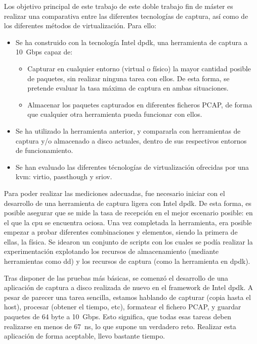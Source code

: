 \newpage
{}

Los objetivo principal de este trabajo de este doble trabajo fin de máster es realizar una comparativa entre las diferentes tecnologías de captura, así como de los diferentes métodos de virtualización. Para ello:

\begin{itemize}
\item Se ha construido con la tecnología Intel \gls{dpdk}, una herramienta de captura a 10~Gbps capaz de:
\begin{itemize}
\item Capturar en cualquier entorno (virtual o físico) la mayor cantidad posible de paquetes, sin realizar ninguna tarea con ellos. De esta forma, se pretende evaluar la tasa máxima de captura en ambas situaciones.
\item Almacenar los paquetes capturados en diferentes ficheros PCAP, de forma que cualquier otra herramienta pueda funcionar con ellos.
\end{itemize}
\item Se ha utilizado la herramienta anterior, y compararla con herramientas de captura y/o almacenado a disco actuales, dentro de sus respectivos entornos de funcionamiento.
\item Se han evaluado las diferentes técnologías de virtualización ofrecidas por una \gls{kvm}: \gls{virtio}, \gls{passthough} y \gls{sriov}.
\end{itemize}


Para poder realizar las mediciones adecuadas, fue necesario iniciar con el desarrollo de una herramienta de captura ligera con Intel \gls{dpdk}. De esta forma, es posible asegurar que se mide la tasa de recepción en el mejor escenario posible: en el que la \gls{cpu} se encuentra ociosa.
Una vez completada la herramienta, era posible empezar a probar diferentes combinaciones y elementos, siendo la primera de ellas, la física. Se idearon un conjunto de scripts con los cuales se podía realizar la experimentación explotando los recursos de almacenamiento (mediante herramientas como dd) y los recursos de captura (como la herramienta en \gls{dpdk}).

Tras disponer de las pruebas más básicas, se comenzó el desarrollo de una aplicación de captura a disco realizada de nuevo en el framework de Intel \gls{dpdk}. A pesar de parecer una tarea sencilla, estamos hablando de capturar (copia hasta el host), procesar (obtener el tiempo, etc), formatear el fichero PCAP, y guardar paquetes de 64 byte a 10~Gbps. Esto significa, que todas esas tareas deben realizarse en menos de 67~ns, lo que supone un verdadero reto. Realizar esta aplicación de forma aceptable, llevo bastante tiempo.

